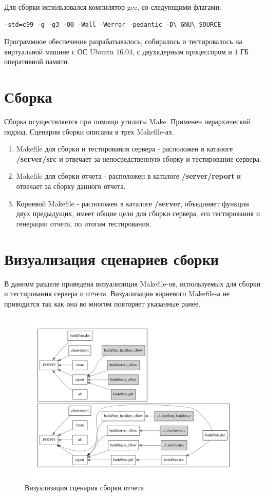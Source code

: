 \documentclass[a4paper,12pt]{report}
\begin{document}
Для сборки использовался компилятор gcc, со следующими флагами: 
\begin{lstlisting}
-std=c99 -g -g3 -O0 -Wall -Werror -pedantic -D\_GNU\_SOURCE
\end{lstlisting}
Программное обеспечение разрабатывалось, собиралось и тестировалось на виртуальной машине с ОС Ubuntu 16.04, с двухядерным процессором и 4 ГБ оперативной памяти. 


\section{Сборка}
Сборка осуществляется при помощи утилиты Make. Применен иерархический подход. Сценарии сборки описаны в трех Makefile-ах. 
\begin{enumerate}
	\item Makefile для сборки и тестирования сервера - расположен в каталоге \textbf{/server/src} и отвечает за непосредственную сборку и тестирование сервера. 
	\item Makefile для сборки отчета - расположен в каталоге \textbf{/server/report} и отвечает за сборку данного отчета. 
	\item Корневой Makefile - расположен в каталоге \textbf{/server}, объединяет функции двух предыдущих, имеет общие цели для сборки сервера, его тестирования и генерации отчета, по итогам тестирования. 	
\end{enumerate}

\section{Визуализация сценариев сборки}
В данном разделе приведена визуализиция Makefile-ов, используемых для сборки и тестирования сервера и отчета. 
Визуализация корневого Makefile-а не приводится так как она во многом повторяет указанные ранее. 
\begin{figure}[H]
	\centering
	\includegraphics[width=\textwidth]{make_pdfs/report_make.pdf}
	\caption{Визуализация сценария сборки отчета}
	\label{fig:make2}
\end{figure}
\end{document}
